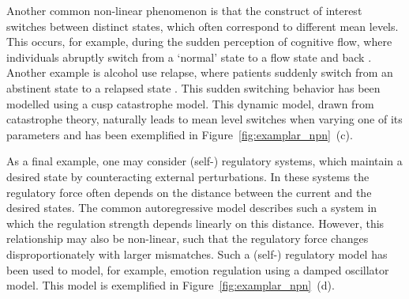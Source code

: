 \documentclass[man, floatsintext]{apa7}
\begin{document}
Another common non-linear phenomenon is that the construct of interest switches
between distinct states, which often correspond to different mean levels. This
occurs, for example, during the sudden perception of cognitive flow, where
individuals abruptly switch from a `normal' state to a flow state and back
\parencite{ceja_suddenly_2012}. Another example is alcohol use relapse, where
patients suddenly switch from an abstinent state to a relapsed state
\parencite{witkiewitz_modeling_2007}. This sudden switching behavior has been
modelled using a cusp catastrophe model. This dynamic model, drawn from
catastrophe theory, naturally leads to mean level switches when varying one of
its parameters \parencite{van_der_maas_sudden_2003,chow_cusp_2015} and has been
exemplified in Figure~\ref{fig:examplar_npn}~(c).

As a final example, one may consider (self-) regulatory systems, which maintain
a desired state by counteracting external perturbations. In these systems the
regulatory force often depends on the distance
between the current and the desired states. The common autoregressive model
describes such a system in which the regulation strength depends linearly on
this distance. However, this relationship may also be non-linear, such that the
regulatory force changes disproportionately with larger mismatches. Such a
(self-) regulatory model has been used to model, for example, emotion
regulation \parencite{chow_emotion_2005} using a damped oscillator model. This
model is exemplified in Figure~\ref{fig:examplar_npn}~(d).
\end{document}
